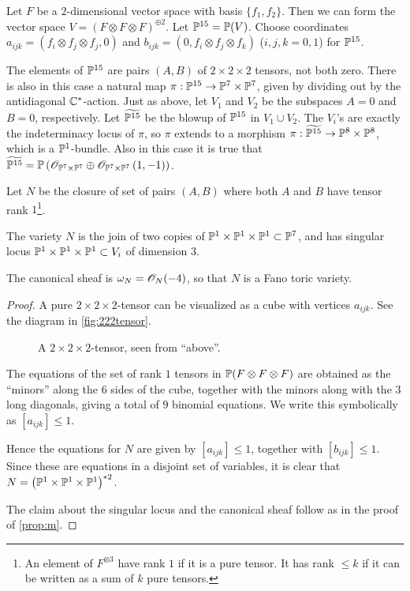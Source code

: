 Let $F$ be a $2$-dimensional vector space with basis $\{f_1,f_2\}$. Then we can form the vector space $V = (F \otimes F \otimes F)^{\oplus 2}$. Let $\P^{15}=\P(V)$. Choose coordinates $a_{ijk}=(f_i \otimes f_j \otimes f_j,0)$ and $b_{ijk}=(0,f_i\otimes f_j \otimes f_k)$ ($i,j,k=0,1$) for $\P^{15}$. 

The elements of $\P^{15}$ are pairs $(A,B)$ of $2 \times 2 \times 2$ tensors, not both zero. There is also in this case a natural map $\pi:\P^{15} \to \P^7 \times \P^7$, given by dividing out by the antidiagonal $\C^\ast$-action. Just as above, let $V_1$ and $V_2$ be the subspaces $A=0$ and $B=0$, respectively. Let $\widetilde{\P^{15}}$ be the blowup of $\P^{15}$ in $V_1 \cup V_2$. The $V_i$'s are exactly the indeterminacy locus of $\pi$, so $\pi$ extends to a morphism $\pi:\widetilde{\P^{15}} \to \P^8 \times \P^8$, which is a $\P^1$-bundle. Also in this case it is true that $\widetilde{\P^{15}}=\P\left(\OO_{\P^7 \times \P^7} \oplus \OO_{\P^7 \times \P^7}\left(1,-1\right)\right)$.

Let $N$ be the closure of set of pairs $(A,B)$ where both $A$ and $B$ have tensor rank $1$\footnote{An element of $F^{\otimes 3}$ have rank $1$ if it is a pure tensor. It has rank $\leq k$ if it can be written as a sum of $k$ pure tensors.}.

\begin{proposition}
The variety $N$ is the join of two copies of $\P^1 \times \P^1 \times \P^1 \subset \P^7$, and has singular locus $\P^1 \times \P^1 \times \P^1 \subset V_i$ of dimension $3$.

The canonical sheaf is $\omega_N = \OO_N(-4)$, so that $N$ is a Fano toric variety.
\end{proposition}

\begin{proof}
A pure $2 \times 2 \times 2$-tensor can be visualized as a cube with vertices $a_{ijk}$. See the diagram in \vref{fig:222tensor}. 

\begin{figure}[t]
\centering

\caption{A $2 \times 2 \times 2$-tensor, seen from ``above''.}
\label{fig:222tensor}
\end{figure}

The equations of the set of rank $1$ tensors in $\P(F \otimes F \otimes F)$ are obtained as the ``minors'' along the $6$ sides of the cube, together with the minors along with the $3$ long diagonals, giving a total of $9$ binomial equations. We write this symbolically as $[a_{ijk}] \leq 1$. 

Hence the equations for $N$ are given by $[a_{ijk}] \leq 1$, together with $[b_{ijk}] \leq 1$. Since these are equations in a disjoint set of variables, it is clear that $N=\left(\P^1 \times \P^1 \times \P^1\right)^{\ast 2}$.

The claim about the singular locus and the canonical sheaf follow as in the proof of \cref{prop:m}.
\end{proof}

